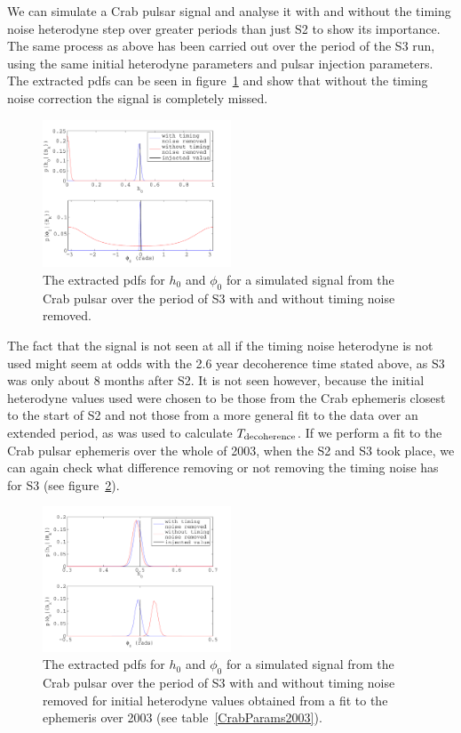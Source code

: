 We can simulate a Crab pulsar signal and analyse it with and without the timing noise heterodyne
step over greater periods than just S2 to show its importance. The same process as above has been
carried out over the period of the S3 run, using the same initial heterodyne parameters and pulsar
injection parameters. The extracted pdfs can be seen in figure~\ref{S3CrabInjection} and show that
without the timing noise correction the signal is completely missed.
\begin{figure}[!htbp]
\begin{center}
\includegraphics[width=0.5\textwidth]{figs/S3CrabInjection}
\caption{The extracted pdfs for $h_0$ and $\phi_0$ for a simulated signal from the
Crab pulsar over the period of S3 with and without timing noise removed.}\label{S3CrabInjection}
\end{center}
\end{figure}
The fact that the signal is not seen at all if the timing noise heterodyne is not used might seem
at odds with the 2.6 year decoherence time stated above, as S3 was only about 8 months after S2.
It is not seen however, because the initial heterodyne values used were chosen to be those from the
Crab ephemeris closest to the start of S2 and not those from a more general fit to the data over an
extended period, as was used to calculate $T_{\rm{decoherence}}$. If we perform a fit to the Crab
pulsar ephemeris over the whole of 2003, when the S2 and S3 took place, we can again check what
difference removing or not removing the timing noise has for S3 (see figure~\ref{S3CrabInjection2}).
\begin{figure}[!htbp]
\begin{center}
\includegraphics[width=0.5\textwidth]{figs/S3CrabInjection2}
\caption[Extracted pdfs of simulated Crab signal during S3.]{The extracted pdfs for $h_0$ and
$\phi_0$ for a simulated signal from the Crab pulsar over the period of S3 with and without timing
noise removed for initial heterodyne values obtained from a fit to the ephemeris over 2003 (see
table~\ref{CrabParams2003}).}\label{S3CrabInjection2}
\end{center}
\end{figure}
